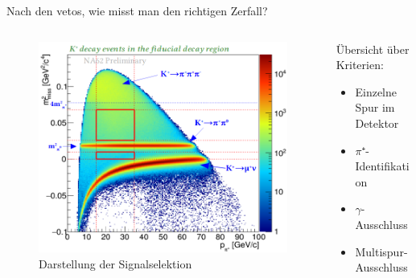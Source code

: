 \documentclass[aspectratio=1610, professionalfonts, 9pt, t]{beamer}
\begin{document}
  \begin{frame}{Nach den vetos, wie misst man den richtigen Zerfall?}
      \begin{columns}[onlytextwidth]
        \begin{column}{0.4\textwidth}
          \begin{figure}[ht]
            \begin{center}
              \includegraphics[height=0.8\textheight]{Images/na62decayregion.png} %
              \caption{Darstellung der Signalselektion}
            \end{center}
          \end{figure}
        \end{column}
        \begin{column}{0.5\textwidth}
          Übersicht über Kriterien:
          \begin{itemize}
            \item Einzelne Spur im Detektor
            \item $\pi⁺$-Identifikation
            \item $\gamma$-Ausschluss
            \item Multispur-Ausschluss
          \end{itemize}
        \end{column}
      \end{columns}
  \end{frame}
\end{document}
